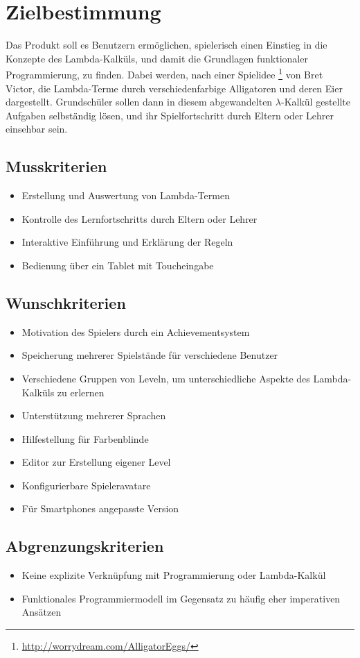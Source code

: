 \section{Zielbestimmung}
Das Produkt soll es Benutzern ermöglichen, spielerisch einen Einstieg in die Konzepte des Lambda-Kalküls, und damit die Grundlagen funktionaler Programmierung, zu finden.
Dabei werden, nach einer Spielidee \footnote{\url{http://worrydream.com/AlligatorEggs/}} von Bret Victor, die Lambda-Terme durch verschiedenfarbige Alligatoren und deren Eier dargestellt.
Grundschüler sollen dann in diesem abgewandelten \(\lambda\)-Kalkül gestellte Aufgaben selbständig lösen, und ihr Spielfortschritt durch Eltern oder Lehrer einsehbar sein.


\subsection{Musskriterien}

\begin{itemize}
	\item Erstellung und Auswertung von Lambda-Termen
	\item Kontrolle des Lernfortschritts durch Eltern oder Lehrer
	\item Interaktive Einführung und Erklärung der Regeln
	\item Bedienung über ein Tablet mit Toucheingabe
\end{itemize}


\subsection{Wunschkriterien}

\begin{itemize}
	\item Motivation des Spielers durch ein Achievementsystem
	\item Speicherung mehrerer Spielstände für verschiedene Benutzer
	\item Verschiedene Gruppen von Leveln, um unterschiedliche Aspekte des Lambda-Kalküls zu erlernen
	\item Unterstützung mehrerer Sprachen
	\item Hilfestellung für Farbenblinde
	\item Editor zur Erstellung eigener Level
	\item Konfigurierbare Spieleravatare
	\item Für Smartphones angepasste Version
\end{itemize}


\subsection{Abgrenzungskriterien}

\begin{itemize}
	\item Keine explizite Verknüpfung mit Programmierung oder Lambda-Kalkül
	\item Funktionales Programmiermodell im Gegensatz zu häufig eher imperativen Ansätzen
\end{itemize}

